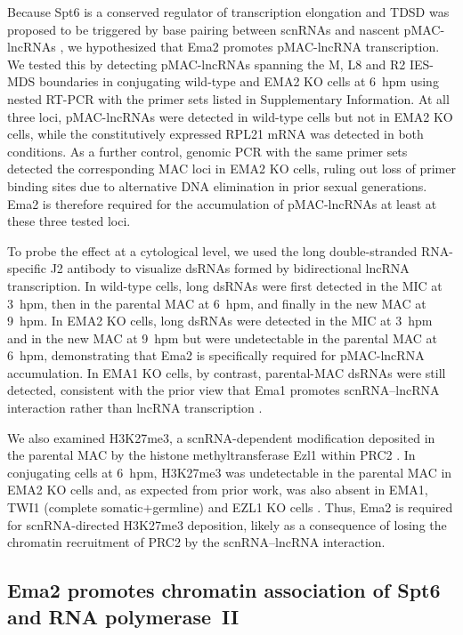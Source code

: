 \documentclass[11pt]{article}
\begin{document}
Because Spt6 is a conserved regulator of transcription elongation and TDSD
was proposed to be triggered by base pairing between scnRNAs and nascent
pMAC-lncRNAs \citep{aronica2008ema1,schoeberl2012biased}, we hypothesized
that Ema2 promotes pMAC-lncRNA transcription. We tested this by detecting
pMAC-lncRNAs spanning the M, L8 and R2 IES-MDS boundaries in conjugating
wild-type and EMA2 KO cells at 6~hpm using nested RT-PCR with the primer
sets listed in Supplementary Information. At all three loci, pMAC-lncRNAs
were detected in wild-type cells but not in EMA2 KO cells, while the
constitutively expressed RPL21 mRNA was detected in both conditions. As a
further control, genomic PCR with the same primer sets detected the
corresponding MAC loci in EMA2 KO cells, ruling out loss of primer binding
sites due to alternative DNA elimination in prior sexual generations. Ema2
is therefore required for the accumulation of pMAC-lncRNAs at least at
these three tested loci.

To probe the effect at a cytological level, we used the long double-stranded
RNA-specific J2 antibody to visualize dsRNAs formed by bidirectional
lncRNA transcription. In wild-type cells, long dsRNAs were first detected
in the MIC at 3~hpm, then in the parental MAC at 6~hpm, and finally in the
new MAC at 9~hpm. In EMA2 KO cells, long dsRNAs were detected in the MIC
at 3~hpm and in the new MAC at 9~hpm but were undetectable in the parental
MAC at 6~hpm, demonstrating that Ema2 is specifically required for
pMAC-lncRNA accumulation. In EMA1 KO cells, by contrast, parental-MAC
dsRNAs were still detected, consistent with the prior view that Ema1
promotes scnRNA--lncRNA interaction rather than lncRNA transcription
\citep{aronica2008ema1}.

We also examined H3K27me3, a scnRNA-dependent modification deposited in the
parental MAC by the histone methyltransferase Ezl1 within
PRC2 \citep{liu2007rnai,frapporti2019ezl1}. In conjugating cells at 6~hpm,
H3K27me3 was undetectable in the parental MAC in EMA2 KO cells and, as
expected from prior work, was also absent in EMA1, TWI1 (complete
somatic+germline) and EZL1 KO cells \citep{liu2007rnai}. Thus, Ema2 is
required for scnRNA-directed H3K27me3 deposition, likely as a consequence
of losing the chromatin recruitment of PRC2 by the scnRNA--lncRNA
interaction.

\subsection{Ema2 promotes chromatin association of Spt6 and RNA
polymerase~II}
\end{document}
